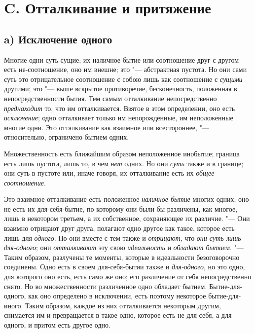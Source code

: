 \bigskip

\section[C. Отталкивание и притяжение]{C. Отталкивание и притяжение}
\subsection[a) Исключение одного]{a) Исключение одного}
Многие одни суть сущие; их наличное бытие или соотношение друг с другом есть
не-соотношение, оно им внешне; это "--- абстрактная пустота. Но они сами суть
это отрицательное соотношение с собою лишь как соотношение с
{\em сущими} другими; это "--- выше вскрытое противоречие,
бесконечность, положенная в непосредственности бытия. Тем самым
отталкивание непосредственно {\em преднаходит} то, что
им отталкивается. Взятое в этом определении, оно есть
{\em исключение}; одно отталкивает только им непорожденные,
им неположенные многие одни. Это отталкивание как взаимное
или всестороннее, "--- относительно, ограничено бытием одних.

Множественность есть ближайшим образом неположенное инобытие; граница есть
лишь пустота, лишь то, в чем {\em нет} одних. Но они
{\em суть} также и в границе; они суть в пустоте или,
иначе говоря, их отталкивание есть их {\em общее соотношение}.

Это взаимное отталкивание есть положенное {\em наличное
бытие} многих одних; оно не есть их для-себя-бытие, по которому они были бы
различены, как многое, лишь в некотором третьем, а их собственное,
сохраняющее их различие. "--- Они взаимно отрицают друг друга, полагают одно
другое как такое, которое есть лишь для {\em одного}.
Но они вместе с тем также и {\em отрицают}, что
{\em они суть лишь для-одного}; они
{\em отталкивают} эту свою {\em идеальность} и {\em обладают
бытием}. "--- Таким образом, разлучены те моменты, которые в идеальности
безоговорочно соединены. Одно есть в своем для-себя-бытии также и
{\em для-одного}, но это одно, для которого оно есть,
есть само же оно; его различение от себя непосредственно снято. Но во
множественности различенное одно обладает бытием. Бытие-для-одного, как оно
определено в исключении, есть поэтому некоторое бытие-для-иного. Таким
образом, каждое из них отталкивается некоторым другим, снимается им и
превращается в такое одно, которое есть не для-себя, а для-одного, и притом
есть другое одно.


